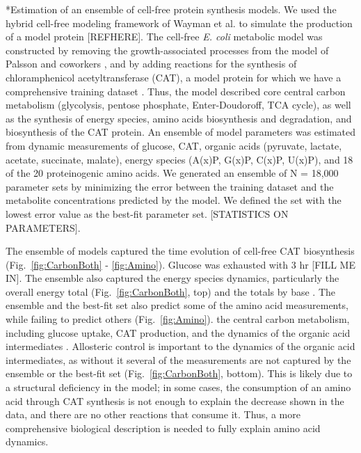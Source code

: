 \documentclass[12pt]{article}
\makeatletter
\renewcommand\subsection{\@startsection
	{subsection}{2}{0mm}
	{-0.05in}
	{-0.5\baselineskip}
	{\normalfont\normalsize\bfseries}}
\makeatother
\begin{document}
\subsection*{Estimation of an ensemble of cell-free protein synthesis models.}
We used the hybrid cell-free modeling framework of Wayman et al. to simulate the production of a model protein [REFHERE].
The cell-free \textit{E. coli} metabolic model was constructed by removing the growth-associated processes from the model of Palsson and coworkers \cite{2000_edwards_palsson_PNAS}, and by adding reactions for the synthesis of chloramphenicol acetyltransferase (CAT), a model protein for which we have a comprehensive training dataset \cite{2005_calhoun_BiotechnologyProgress}.
Thus, the model described core central carbon metabolism (glycolysis, pentose phosphate, Enter-Doudoroff, TCA cycle),
as well as the synthesis of energy species, amino acids biosynthesis and degradation, and biosynthesis of the CAT protein.
An ensemble of model parameters was estimated from dynamic measurements of glucose, CAT, organic acids (pyruvate, lactate, acetate, succinate, malate), energy species (A(x)P, G(x)P, C(x)P, U(x)P), and 18 of the 20 proteinogenic amino acids. We generated an ensemble of N = 18,000 parameter sets by minimizing the error between the training dataset and the metabolite concentrations predicted by the model. We defined the set with the lowest error value as the best-fit parameter set. [STATISTICS ON PARAMETERS].

The ensemble of models captured the time evolution of cell-free CAT biosynthesis (Fig.~\ref{fig:CarbonBoth} - \ref{fig:Amino}).
Glucose was exhausted with 3 hr [FILL ME IN].
The ensemble also captured the energy species dynamics, particularly the overall energy total (Fig.~\ref{fig:CarbonBoth}, top) and the totals by base .
The ensemble and the best-fit set also predict some of the amino acid measurements, while failing to predict others (Fig.~\ref{fig:Amino}).
the central carbon metabolism, including glucose uptake, CAT production, and the dynamics of the organic acid intermediates .
Allosteric control is important to the dynamics of the organic acid intermediates, as without it several of the measurements are not captured by the ensemble or the best-fit set (Fig.~\ref{fig:CarbonBoth}, bottom).
This is likely due to a structural deficiency in the model; in some cases, the consumption of an amino acid through CAT synthesis is not enough to explain the decrease shown in the data, and there are no other reactions that consume it. Thus, a more comprehensive biological description is needed to fully explain amino acid dynamics.
\end{document}

